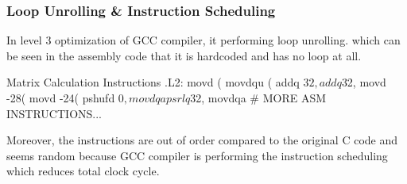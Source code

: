 \documentclass[12pt, a4paper]{article}
\begin{document}
    \pagebreak

            \subsubsection{Loop Unrolling \& Instruction Scheduling}
                In level 3 optimization of GCC compiler, it performing loop unrolling.
                which can be seen in the assembly code that it is hardcoded and
                has no loop at all.

                \begin{codeblock}[minted language=asm]{Matrix Calculation Instructions}
                    .L2:
                        movd    (%
                        movdqu  (%
                        addq    $32, %
                        addq    $32, %
                        movd    -28(%
                        movd    -24(%
                        pshufd  $0, %
                        movdqa  %
                        psrlq   $32, %
                        movdqa  %
                        # MORE ASM INSTRUCTIONS...
                \end{codeblock}

                Moreover, the instructions are out of order compared to the original C code
                and seems random because GCC compiler is performing the instruction scheduling
                which reduces total clock cycle.
\end{document}

